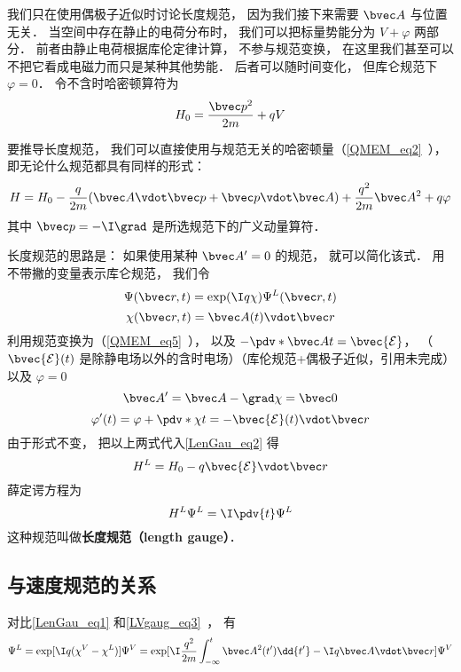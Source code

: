 
\begin{issues}
\issueTODO
\end{issues}


我们只在使用偶极子近似时讨论长度规范， 因为我们接下来需要 $\bvec A$ 与位置无关． 当空间中存在静止的电荷分布时， 我们可以把标量势能分为 $V + \varphi$ 两部分． 前者由静止电荷根据库伦定律计算， 不参与规范变换， 在这里我们甚至可以不把它看成电磁力而只是某种其他势能． 后者可以随时间变化， 但库仑规范下 $\varphi = 0$． 令不含时哈密顿算符为
\begin{equation}
H_0 = \frac{\bvec p^2}{2m} + qV
\end{equation}

要推导长度规范， 我们可以直接使用与规范无关的哈密顿量（\autoref{QMEM_eq2}~）， 即无论什么规范都具有同样的形式：
\begin{equation}\label{LenGau_eq2}
H = H_0 - \frac{q}{2m} (\bvec A \vdot \bvec p + \bvec p \vdot \bvec A)
+ \frac{q^2}{2m} \bvec A^2 + q \varphi
\end{equation}
其中 $\bvec p = -\I \grad$ 是所选规范下的广义动量算符．

长度规范的思路是： 如果使用某种 $\bvec A' = 0$ 的规范， 就可以简化该式． 用不带撇的变量表示库仑规范， 我们令
\begin{equation}\label{LenGau_eq1}
\Psi(\bvec r, t) = \exp(\I q\chi)\Psi^L(\bvec r, t)
\end{equation}
\begin{equation}
\chi(\bvec r, t) = \bvec A(t) \vdot \bvec r
\end{equation}
利用规范变换为（\autoref{QMEM_eq5}~）， 以及 $-\pdv*{\bvec A}{t} = \bvec {\mathcal E}$， （$\bvec {\mathcal E}(t)$ 是除静电场以外的含时电场）（库伦规范+偶极子近似，引用未完成）以及 $\varphi = 0$
\begin{equation}
\bvec A' = \bvec A - \grad \chi = \bvec 0
\end{equation}
\begin{equation}
\varphi'(t) = \varphi + \pdv*{\chi}{t} = -\bvec {\mathcal E}(t) \vdot \bvec r
\end{equation}
由于形式不变， 把以上两式代入\autoref{LenGau_eq2} 得
\begin{equation}
H^L = H_0 - q\bvec{\mathcal{E}} \vdot \bvec r
\end{equation}
薛定谔方程为
\begin{equation}
H^L \Psi^L = \I \pdv{t} \Psi^L
\end{equation}
这种规范叫做\textbf{长度规范（length gauge）}．

\subsection{与速度规范的关系}
对比\autoref{LenGau_eq1} 和\autoref{LVgaug_eq3}~， 有
\begin{equation}\label{LenGau_eq3}
\Psi^L = \exp[\I q(\chi^V - \chi^L)]\Psi^V = \exp[\I\frac{q^2}{2m}\int_{-\infty}^t \bvec A^2(t')\dd{t'} - \I q \bvec A\vdot \bvec r] \Psi^V
\end{equation}
